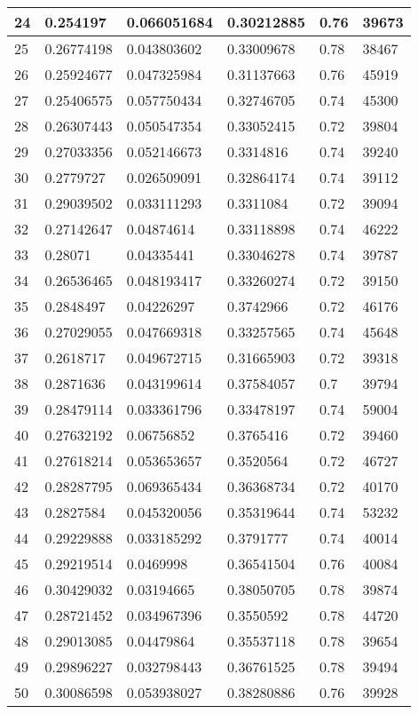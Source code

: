 \begin{longtable}{|l|l|l|l|l|l|}
24 & 0.254197 & 0.066051684 & 0.30212885 & 0.76 & 39673 \\ \hline 
25 & 0.26774198 & 0.043803602 & 0.33009678 & 0.78 & 38467 \\ \hline 
26 & 0.25924677 & 0.047325984 & 0.31137663 & 0.76 & 45919 \\ \hline 
27 & 0.25406575 & 0.057750434 & 0.32746705 & 0.74 & 45300 \\ \hline 
28 & 0.26307443 & 0.050547354 & 0.33052415 & 0.72 & 39804 \\ \hline 
29 & 0.27033356 & 0.052146673 & 0.3314816 & 0.74 & 39240 \\ \hline 
30 & 0.2779727 & 0.026509091 & 0.32864174 & 0.74 & 39112 \\ \hline 
31 & 0.29039502 & 0.033111293 & 0.3311084 & 0.72 & 39094 \\ \hline 
32 & 0.27142647 & 0.04874614 & 0.33118898 & 0.74 & 46222 \\ \hline 
33 & 0.28071 & 0.04335441 & 0.33046278 & 0.74 & 39787 \\ \hline 
34 & 0.26536465 & 0.048193417 & 0.33260274 & 0.72 & 39150 \\ \hline 
35 & 0.2848497 & 0.04226297 & 0.3742966 & 0.72 & 46176 \\ \hline 
36 & 0.27029055 & 0.047669318 & 0.33257565 & 0.74 & 45648 \\ \hline 
37 & 0.2618717 & 0.049672715 & 0.31665903 & 0.72 & 39318 \\ \hline 
38 & 0.2871636 & 0.043199614 & 0.37584057 & 0.7 & 39794 \\ \hline 
39 & 0.28479114 & 0.033361796 & 0.33478197 & 0.74 & 59004 \\ \hline 
40 & 0.27632192 & 0.06756852 & 0.3765416 & 0.72 & 39460 \\ \hline 
41 & 0.27618214 & 0.053653657 & 0.3520564 & 0.72 & 46727 \\ \hline 
42 & 0.28287795 & 0.069365434 & 0.36368734 & 0.72 & 40170 \\ \hline 
43 & 0.2827584 & 0.045320056 & 0.35319644 & 0.74 & 53232 \\ \hline 
44 & 0.29229888 & 0.033185292 & 0.3791777 & 0.74 & 40014 \\ \hline 
45 & 0.29219514 & 0.0469998 & 0.36541504 & 0.76 & 40084 \\ \hline 
46 & 0.30429032 & 0.03194665 & 0.38050705 & 0.78 & 39874 \\ \hline 
47 & 0.28721452 & 0.034967396 & 0.3550592 & 0.78 & 44720 \\ \hline 
48 & 0.29013085 & 0.04479864 & 0.35537118 & 0.78 & 39654 \\ \hline 
49 & 0.29896227 & 0.032798443 & 0.36761525 & 0.78 & 39494 \\ \hline 
50 & 0.30086598 & 0.053938027 & 0.38280886 & 0.76 & 39928 \\ \hline 
\end{longtable}